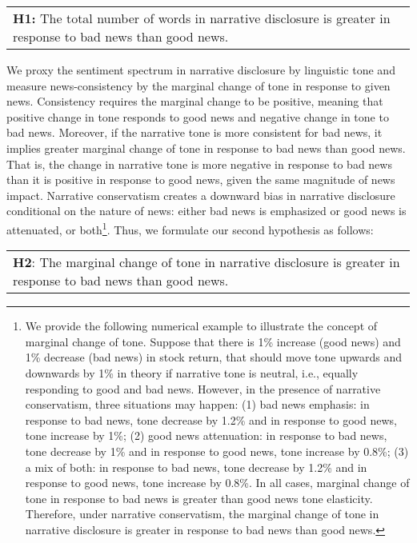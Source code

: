\documentclass[a4paper]{article}
\begin{document}
\begin{spacing}{2}
\begin{center}
	\begin{tabular}{l}
		\textbf{H1:} The total number of words in narrative disclosure is greater in response to bad news than good news.
	\end{tabular}
\end{center}

We proxy the sentiment spectrum in narrative disclosure by linguistic tone and measure news-consistency by the marginal change of tone in response to given news. Consistency requires the marginal change to be positive, meaning that positive change in tone responds to good news and negative change in tone to bad news. Moreover, if the narrative tone is more consistent for bad news, it implies greater marginal change of tone in response to bad news than good news. That is, the change in narrative tone is more negative in response to bad news than it is positive in response to good news, given the same magnitude of news impact. Narrative conservatism creates a downward bias in narrative disclosure conditional on the nature of news: either bad news is emphasized or good news is attenuated, or both\footnote{We provide the following numerical example to illustrate the concept of marginal change of tone. Suppose that there is 1\% increase (good news) and 1\% decrease (bad news) in stock return, that should move tone upwards and downwards by 1\% in theory if narrative tone is neutral, i.e., equally responding to good and bad news. However, in the presence of narrative conservatism, three situations may happen: (1) bad news emphasis: in response to bad news, tone decrease by 1.2\% and in response to good news, tone increase by 1\%; (2) good news attenuation: in response to bad news, tone decrease by 1\% and in response to good news, tone increase by 0.8\%; (3) a mix of both: in response to bad news, tone decrease by 1.2\% and in response to good news, tone increase by 0.8\%. In all cases, marginal change of tone in response to bad news is greater than good news tone elasticity. Therefore, under narrative conservatism, the marginal change of tone in narrative disclosure is greater in response to bad news than good news.}. 
Thus, we formulate our second hypothesis as follows:

\begin{center}
	\begin{tabular}{l}
		\textbf{H2}: The marginal change of tone in narrative disclosure is greater in response to bad news than good news.
	\end{tabular}
\end{center}


\end{spacing}
\end{document}
